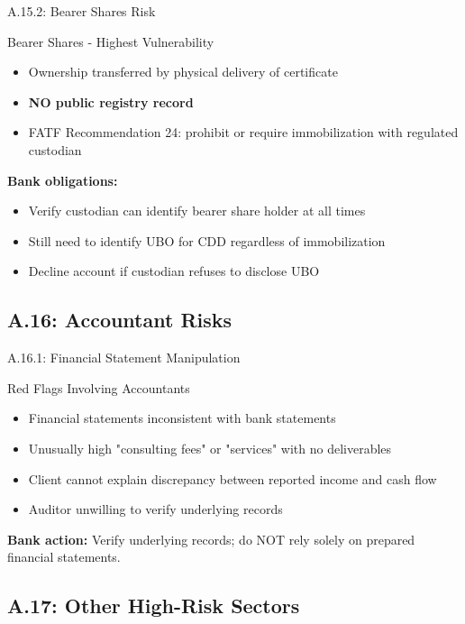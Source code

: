 \documentclass{beamer}
\begin{document}
	\begin{frame}{A.15.2: Bearer Shares Risk}
		\begin{block}{Bearer Shares - Highest Vulnerability}
			\begin{itemize}
				\item Ownership transferred by physical delivery of certificate
				\item \textbf{NO public registry record}
				\item FATF Recommendation 24: prohibit or require immobilization with regulated custodian
			\end{itemize}
		\end{block}
		\textbf{Bank obligations:}
		\begin{itemize}
			\item Verify custodian can identify bearer share holder at all times
			\item Still need to identify UBO for CDD regardless of immobilization
			\item Decline account if custodian refuses to disclose UBO
		\end{itemize}
	\end{frame}
	
	\subsection{A.16: Accountant Risks}
	
	\begin{frame}{A.16.1: Financial Statement Manipulation}
		\begin{block}{Red Flags Involving Accountants}
			\begin{itemize}
				\item Financial statements inconsistent with bank statements
				\item Unusually high "consulting fees" or "services" with no deliverables
				\item Client cannot explain discrepancy between reported income and cash flow
				\item Auditor unwilling to verify underlying records
			\end{itemize}
		\end{block}
		\textbf{Bank action:} Verify underlying records; do NOT rely solely on prepared financial statements.
	\end{frame}
	
	\subsection{A.17: Other High-Risk Sectors}
	
\end{document}
